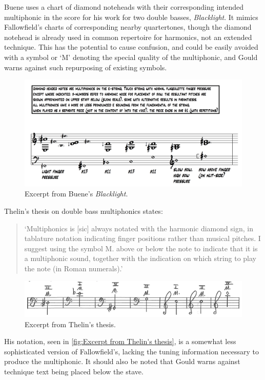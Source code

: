 Buene uses a chart of diamond noteheads with their corresponding intended multiphonic in the score for his work for two double basses, \emph{Blacklight}.\autocite[39-42]{thelinMultiphonicsDoubleBass2011}
It mimics Fallowfield's charts of corresponding nearby quartertones, though the diamond notehead is already used in common repertoire for harmonics, not an extended technique. 
This has the potential to cause confusion, and could be easily avoided with a symbol or `M' denoting the special quality of the multiphonic, and Gould warns against such repurposing of existing symbols.\autocite[494]{gouldBars2011}

\begin{figure}
  \includegraphics[width=\linewidth]{./resources/bueneMultiphonicNotation.png}
  \caption{Excerpt from Buene's \emph{Blacklight}.}
\label{fig:Excerpt from Buene's Blacklight}
\end{figure}

Thelin's thesis on double bass multiphonics states:
\begin{quotation}
    `Multiphonics is [sic] always notated with the harmonic diamond sign, in tablature notation
indicating finger positions rather than musical pitches. I suggest using the symbol M. above or
below the note to indicate that it is a multiphonic sound, together with the indication on which
string to play the note (in Roman numerals).'\autocite[6]{thelinMultiphonicsDoubleBass2011}
\end{quotation}


\begin{figure}
    \includegraphics[width=\linewidth]{./resources/thelinMultiphonicNotation.png}
    \caption{Excerpt from Thelin's thesis.}
  \label{fig:Excerpt from Thelin's thesis}
  \end{figure}
His notation, seen in \autoref{fig:Excerpt from Thelin's thesis}, is a somewhat less sophisticated version of Fallowfield's, lacking the tuning information necessary to produce the multiphonic. 
It should also be noted that Gould warns against technique text being placed below the stave.\autocite[492]{gouldBars2011}

